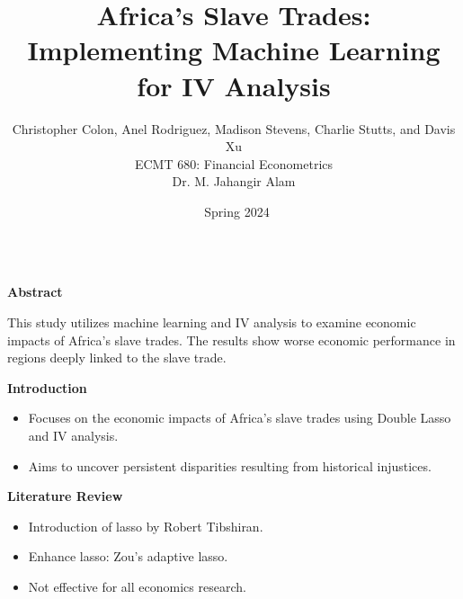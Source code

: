 \documentclass[final]{beamer}
\title{\Huge Africa's Slave Trades: Implementing Machine Learning for IV Analysis} %
\author{\Large Christopher Colon, Anel Rodriguez, Madison Stevens, Charlie Stutts, and Davis Xu\\
ECMT 680: Financial Econometrics \\
Dr. M. Jahangir Alam}
\institute{\Large Texas A\&M University} %
\date{\Large\ Spring 2024} %
\begin{document}
\begin{frame}[t]

\begin{block}{}
\centering
\maketitle
\end{block}

\begin{columns}[T] %

\begin{column}{.32\textwidth}
    \begin{block}{\Large \textbf{Abstract}} %


    \Large %
   This study utilizes machine learning and IV analysis to examine economic impacts of Africa's slave trades. The results show worse economic performance in regions deeply linked to the slave trade.
    \end{block}

    \vspace{0.3cm} %

    \begin{block}{\Large \textbf{Introduction}} %
    \Large %
   \begin{itemize}
   \item Focuses on the economic impacts of Africa's slave trades using Double Lasso and IV analysis.
   \item Aims to uncover persistent disparities resulting from historical injustices.
    \end{itemize}
    \end{block}

    \vspace{0.3cm} %

     \begin{block}{\Large \textbf{Literature Review}} %
    \Large %
   \begin{itemize}
   \item Introduction of lasso by Robert Tibshiran.
   \item Enhance lasso: Zou's adaptive lasso.
   \item Not effective for all economics research.
    \end{itemize}
    \end{block}


\end{column}
\end{columns}
\end{frame}
\end{document}
